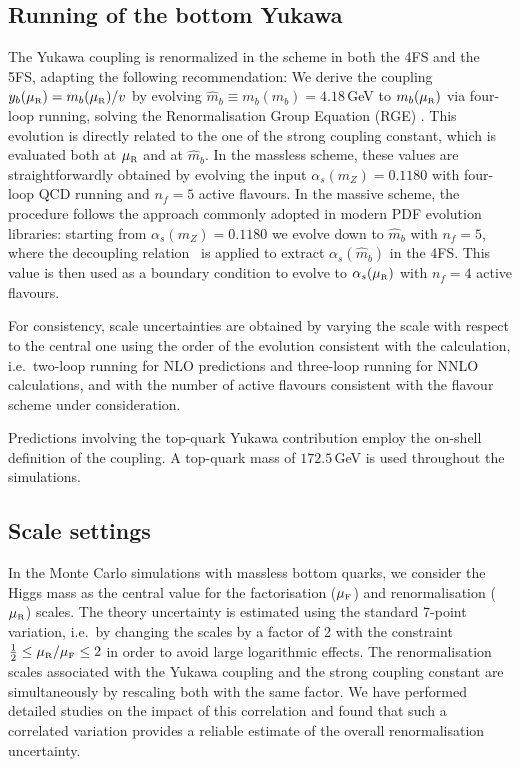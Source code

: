 \documentclass[11pt,a4paper]{article}
\begin{document}
\subsection{Running of the bottom Yukawa}
The Yukawa coupling is renormalized in the \MSbar{} scheme in both the 4FS and the 5FS, adapting the following recommendation: We derive the coupling $y_b(\muR)=m_b(\muR)/v$ by 
evolving $\hat{m}_b\equiv m_b(m_b)=4.18$\,GeV to $m_b(\muR)$ via four-loop running, solving the Renormalisation Group Equation (RGE) \cite{harlander:2002wh,baikov_2014}. 
This evolution is directly related to the one of the strong coupling constant, which is evaluated both at $\muR$ and at $\hat{m}_b$. 
In the massless scheme, these values are straightforwardly obtained by evolving the input $\alpha_s(m_Z) = 0.1180$ with four-loop QCD running and $n_f = 5$ active flavours.
In the massive scheme, the procedure follows the approach commonly adopted in modern PDF evolution libraries: starting from $\alpha_s(m_Z) = 0.1180$ we evolve down to $\hat{m}_b$
with $n_f = 5$, where the decoupling relation~\cite{vogt:2004ns} is applied to extract $\alpha_s(\hat{m}_b)$ in the 4FS. 
This value is then used as a boundary condition to evolve to $\alpha_s(\muR)$ with $n_f = 4$ active flavours.

For consistency, scale uncertainties are obtained by varying the scale with respect to the central one using the order of the evolution consistent with the 
calculation, i.e.\ two-loop running for NLO predictions and three-loop running for NNLO calculations, and with the number of active flavours consistent with 
the flavour scheme under consideration.

Predictions involving the top-quark Yukawa contribution employ the on-shell definition of the coupling. A top-quark mass of $172.5$\,GeV is used throughout the simulations.

\subsection{Scale settings}
In the Monte Carlo simulations with massless bottom quarks, we consider the Higgs mass as the central value for the factorisation ($\muF$) and renormalisation ($\muR$) scales. The theory uncertainty is estimated using the standard 7-point variation, i.e.\ by changing the scales by a factor of 2 with the constraint $\frac{1}{2}\leq\muR/\muF\leq 2$ in order to avoid large logarithmic effects. The renormalisation scales associated with the Yukawa coupling and the strong coupling constant are simultaneously by rescaling both with the same factor. We have performed detailed studies on the impact of this correlation and found that such a correlated variation provides a reliable estimate of the overall renormalisation uncertainty.
\end{document}
